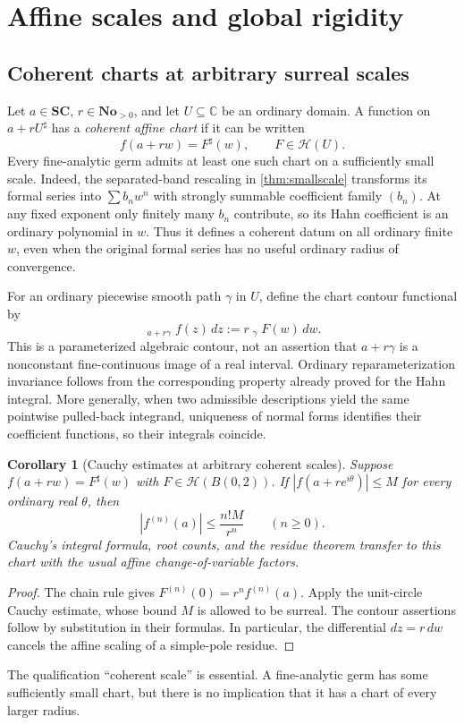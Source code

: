 \documentclass[11pt,letterpaper]{article}
\newtheorem{corollary}[theorem]{Corollary}
\theoremstyle{definition}
\theoremstyle{remark}
\newcommand{\No}{\mathbf{No}}
\newcommand{\SC}{\mathbf{SC}}
\newcommand{\C}{\mathbb C}
\newcommand{\HH}{\mathcal H}
\newcommand{\HInt}{\mathop{\int^{\!H}}\nolimits}
\newcommand{\sh}{^{\sharp}}
\numberwithin{equation}{section}
\begin{document}
\section{Affine scales and global rigidity}\label{sec:allscale}
\subsection{Coherent charts at arbitrary surreal scales}
Let $a\in\SC$, $r\in\No_{>0}$, and let $U\subseteq\C$ be an ordinary domain. A function on $a+rU\sh$ has a \emph{coherent affine chart} if it can be written
\[
 f(a+rw)=F\sh(w),\qquad F\in\HH(U).
\]
Every fine-analytic germ admits at least one such chart on a sufficiently small scale. Indeed, the separated-band rescaling in \cref{thm:smallscale} transforms its formal series into $\sum b_nw^n$ with strongly summable coefficient family $(b_n)$. At any fixed exponent only finitely many $b_n$ contribute, so its Hahn coefficient is an ordinary polynomial in $w$. Thus it defines a coherent datum on all ordinary finite $w$, even when the original formal series has no useful ordinary radius of convergence.

For an ordinary piecewise smooth path $\gamma$ in $U$, define the chart contour functional by
\begin{equation}\label{eq:chartintegral}
 \HInt_{a+r\gamma}f(z)\,dz
 :=r\HInt_\gamma F(w)\,dw.
\end{equation}
This is a parameterized algebraic contour, not an assertion that $a+r\gamma$ is a nonconstant fine-continuous image of a real interval. Ordinary reparameterization invariance follows from the corresponding property already proved for the Hahn integral. More generally, when two admissible descriptions yield the same pointwise pulled-back integrand, uniqueness of normal forms identifies their coefficient functions, so their integrals coincide.

\begin{corollary}[Cauchy estimates at arbitrary coherent scales]\label{cor:scaledCauchy}
Suppose $f(a+rw)=F\sh(w)$ with $F\in\HH(B(0,2))$. If $|f(a+re^{i\theta})|\le M$ for every ordinary real $\theta$, then
\begin{equation}\label{eq:scaledCauchy}
 |f^{(n)}(a)|\le \frac{n!M}{r^n}\qquad(n\ge0).
\end{equation}
Cauchy's integral formula, root counts, and the residue theorem transfer to this chart with the usual affine change-of-variable factors.
\end{corollary}
\begin{proof}
The chain rule gives $F^{(n)}(0)=r^nf^{(n)}(a)$. Apply the unit-circle Cauchy estimate, whose bound $M$ is allowed to be surreal. The contour assertions follow by substitution in their formulas. In particular, the differential $dz=r\,dw$ cancels the affine scaling of a simple-pole residue.
\end{proof}
The qualification ``coherent scale'' is essential. A fine-analytic germ has some sufficiently small chart, but there is no implication that it has a chart of every larger radius.
\end{document}
